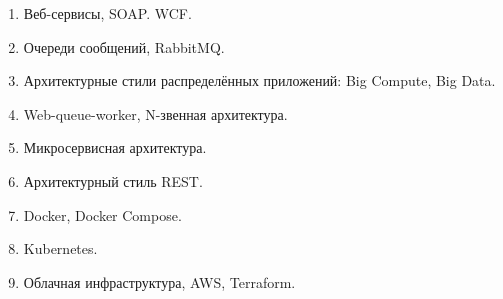 \documentclass[a5paper]{article}
\begin{document}
\begin{enumerate}
    \item Веб-сервисы, SOAP. WCF.
    \item Очереди сообщений, RabbitMQ. %
    \item Архитектурные стили распределённых приложений: Big Compute, Big Data.
    \item Web-queue-worker, N-звенная архитектура.
    \item Микросервисная архитектура.
    \item Архитектурный стиль REST.
    \item Docker, Docker Compose.
    \item Kubernetes.
    \item Облачная инфраструктура, AWS, Terraform.
\end{enumerate}
\end{document}
